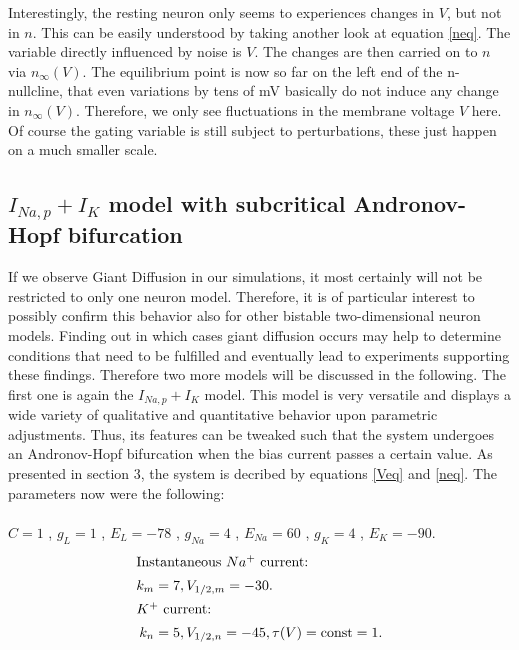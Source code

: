 \documentclass[12pt,a4paper]{article}
\begin{document}
Interestingly, the resting neuron only seems to experiences changes in $V$, but not in $n$. This can be easily understood by taking another look at equation \ref{neq}. The variable directly influenced by noise is $V$. The changes are then carried on to $n$ via $n_\infty(V)$. The equilibrium point is now so far on the left end of the n-nullcline, that even variations by tens of mV basically do not induce any change in $n_\infty(V)$. Therefore, we only see fluctuations in the membrane voltage $V$ here. Of course the gating variable is still subject to perturbations, these just happen on a much smaller scale.
\subsection{$I_{Na,p}+I_K$ model with subcritical Andronov-Hopf bifurcation}
If we observe Giant Diffusion in our simulations, it most certainly will not be restricted to only one neuron model. Therefore, it is of particular interest to possibly confirm this behavior also for other bistable two-dimensional neuron models. Finding out in which cases giant diffusion occurs may help to determine conditions that need to be fulfilled and eventually lead to experiments supporting these findings. Therefore two more models will be discussed in the following.
The first one is again the $I_{Na,p}+I_K$ model.
This model is very versatile and displays a wide variety of qualitative and quantitative behavior upon parametric adjustments. Thus, its features can be tweaked such that the system undergoes an Andronov-Hopf bifurcation when the bias current passes a certain value. As presented in section 3, the system is decribed by equations \ref{Veq} and \ref{neq}. The parameters now were the following:\\\\
$C=1$ , $g_L=1$ , $E_L=-78$ , $g_{Na}=4$ , $E_{Na}=60$ , $g_K=4$ , $E_K=-90$.
\begin{align*}
\intertext{Instantaneous $Na^+$ current:} k_m&=7 , V_{1/2,m}=-30. 
\\
\intertext{$K^+$ current:} k_n&=5 , V_{1/2,n}=-45 , \tau(V)=\text{const}=1.
\end{align*}
\end{document}
